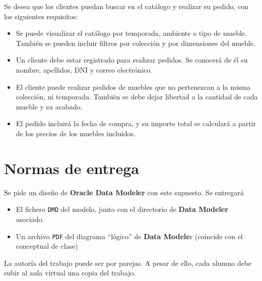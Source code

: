 Se desea que los clientes puedan buscar en el catálogo y realizar su pedido, con los siguientes requisitos:
\begin{itemize}
\item Se puede visualizar el catálogo por temporada, ambiente o tipo de mueble. También se pueden incluir filtros por colección y por dimensiones del mueble.
\item Un cliente debe estar registrado para realizar pedidos. Se conocerá de él su nombre, apellidos, DNI y correo electrónico.
\item El cliente puede realizar pedidos de muebles que no pertenezcan a la misma colección, ni temporada. También se debe dejar libertad a la cantidad de cada mueble y su acabado.
\item El pedido incluirá la fecha de compra, y su importe total se calculará a partir de los precios de los muebles incluidos.
\end{itemize}

\section{Normas de entrega}
Se pide un diseño de \textbf{Oracle Data Modeler} con este supuesto. Se entregará
\begin{itemize}
\item  El fichero \texttt{DMD} del modelo, junto con el directorio de \textbf{Data Modeler} asociado.
\item Un archivo \texttt{PDF} del diagrama ``lógico'' de \textbf{Data Modele}r (coincide con el conceptual de clase)

\end{itemize}

La autoría del trabajo puede ser por parejas. A pesar de ello, cada alumno debe subir al aula virtual una copia del trabajo.



